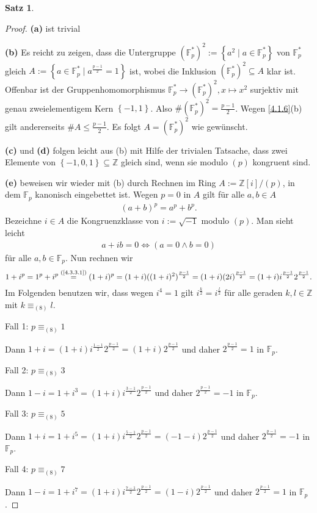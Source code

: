 \documentclass[
twoside=semi,
fontsize=12,
DIV=12, 
cleardoublepage=current,
leqno,
headings=optiontoheadandtoc, 
toc=idx
]{scrbook}
\newcommand{\Z}{\mathbb{Z}}
\newcommand{\F}{\mathbb{F}}
\newcommand{\set}[1]{\left\{ #1 \right\}}
\theoremstyle{definition}
\newtheorem{satz}[definition]{Satz}
\begin{document}
\begin{satz}
 		\begin{proof}\hfill\newline
 			\textbf{(a)} ist trivial
 			
 			\medskip\noindent
 			\textbf{(b)} Es reicht zu zeigen, dass die Untergruppe $(\F_p^*)^2 := \set{a^2 \mid a \in \F_p^*}$ von $\F_p^*$ gleich
 			$A:= \set{a \in \F_p^* \mid a^{\frac{p-1}{2}} = 1}$ ist, wobei die Inklusion $(\F_p^*)^2 \subseteq A$ klar ist. Offenbar ist
 			der Gruppenhomomorphismus $\F_p^* \to (\F_p^*)^2, x \mapsto x^2$ surjektiv mit genau zweielementigem Kern $\set{-1, 1}$.
 			Also $\#(\F_p^*)^2 = \frac{p-1}{2}$. Wegen \ref{4.1.6}(b) gilt andererseits $\#A \leq \frac{p-1}{2}$. Es folgt $A = (\F_p^*)^2$ wie gew\"unscht.
 			
 			\medskip\noindent
 			\textbf{(c)} und \textbf{(d)} folgen leicht aus (b) mit Hilfe der trivialen Tatsache, dass zwei Elemente von $\set{-1, 0, 1} \subseteq \Z$ gleich sind, wenn sie
 			modulo $(p)$ kongruent sind.
 			
 			\medskip\noindent
 			\textbf{(e)} beweisen wir wieder mit (b) durch Rechnen im Ring $A:= \Z[i]/(p)$, in dem $\F_p$ kanonisch eingebettet ist. Wegen $p = 0$ in $A$ gilt f\"ur alle 
 			$a, b \in A$
 			\begin{align}
 				(a+b)^p = a^p + b^p.\label{4.3.3.1}\tag{$*$}
 			\end{align}
 			Bezeichne $i \in A$ die Kongruenzklasse von $i := \sqrt{-1}$ modulo $(p)$. Man sieht leicht
 			\begin{align}
 				a+ib = 0 \Longleftrightarrow (a = 0 \land b = 0) \label{4.3.3.2}\tag{$**$}
 			\end{align}
 			f\"ur alle $a, b \in \F_p$. Nun rechnen wir 
 				\[1+i^p = 1^p+i^p \overset{(\textrm{\ref{4.3.3.1}})}{=} (1+i)^p = (1+i)((1+i)^2)^{\frac{p-1}{2}} = (1+i)(2i)^{\frac{p-1}{2}} = (1+i)i^{\frac{p-1}{2}}2^{\frac{p-1}{2}}.\]
 			Im Folgenden benutzen wir, dass wegen $i^4 = 1$ gilt $i^{\frac{k}{2}} = i^{\frac{l}{2}}$ f\"ur alle geraden $k, l \in \Z$ mit $k \equiv_{(8)} l$.
 			
 			Fall 1: $p \equiv_{(8)} 1$
 			
 			Dann $1+i = (1+i)i^{\frac{1-1}{2}}2^{\frac{p-1}{2}} = (1+i)2^{\frac{p-1}{2}}$ und daher $2^{\frac{p-1}{2}} = 1$ in $\F_p$.
 			
 			Fall 2: $p \equiv_{(8)} 3$
 			
 			Dann $1-i = 1 + i^3  = (1+i)i^{\frac{3-1}{2}}2^{\frac{p-1}{2}}$ und daher $2^{\frac{p-1}{2}} = -1$ in $\F_p$.
 			
 			Fall 3: $p \equiv_{(8)} 5$
 			
 			Dann $1+i = 1+i^5 = (1+i)i^{\frac{5-1}{2}}2^{\frac{p-1}{2}} = (-1-i)2^{\frac{p-1}{2}}$ und daher $2^{\frac{p-1}{2}} = -1$ in $\F_p$.
 			
 			Fall 4: $p \equiv_{(8)} 7$
 			
 			Dann $1-i = 1+i^7 = (1+i)i^{\frac{7-1}{2}}2^{\frac{p-1}{2}} = (1-i)2^{\frac{p-1}{2}}$ und daher $2^{\frac{p-1}{2}} = 1$ in $\F_p$.
 		\end{proof}
 	\end{satz}
 
\end{document}
